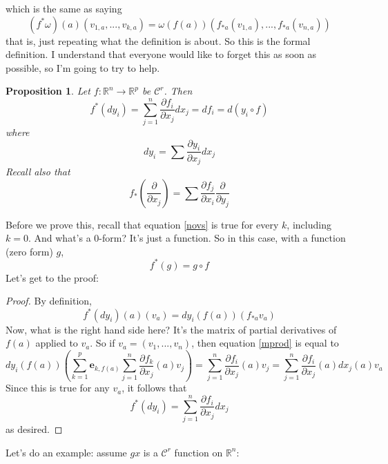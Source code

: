 \documentclass{article}
\newtheorem{proposition}{Proposition}
\newcommand{\reals}[0]{\mathbb{R}}
\newcommand{\mc}[1]{\mathcal{#1}}
\newcommand{\prt}[2]{\frac{\partial #1}{\partial #2}}
\newcommand{\mb}[1]{\mathbf{#1}}
\begin{document}
which is the same as saying
\begin{equation}
  (f^*\omega)(a)(v_{1, a},...,v_{k, a}) = \omega(f(a))(f_{*a}(v_{1,a}),...,f_{*a}(v_{n,a}))
\end{equation}
that is, just repeating what the definition is about. So this is the formal definition. I understand that everyone would like to forget this as soon as possible, so I'm going to try to help.
\begin{proposition}
  Let \(f: \reals^n \to \reals^p\) be \(\mc{C}^r\). Then
  \begin{equation}
    f^*(dy_i) = \sum_{j = 1}^n\prt{f_i}{x_j}dx_j = df_i = d(y_i \circ f)
  \end{equation}
  where
  \begin{equation}
    dy_i = \sum\prt{y_i}{x_j}dx_j
  \end{equation}
  Recall also that
  \begin{equation}
    f_*\left(\prt{}{x_j}\right) = \sum\prt{f_j}{x_i}\prt{}{y_j}
  \end{equation}
\end{proposition}
Before we prove this, recall that equation \ref{novs} is true for every \(k\), including \(k = 0\). And what's a 0-form? It's just a function. So in this case, with a function (zero form) \(g\),
\begin{equation}
  f^*(g) = g \circ f
\end{equation}
Let's get to the proof:
\begin{proof}
  By definition,
  \begin{equation}
    f^*(dy_i)(a)(v_a) = dy_i(f(a))(f_{*a}v_a)
    \label{mprod}
  \end{equation}
  Now, what is the right hand side here? It's the matrix of partial derivatives of \(f(a)\) applied to \(v_a\). So if \(v_a = (v_1,...,v_n)\), then equation \ref{mprod} is equal to
  \begin{equation}
    dy_i(f(a))\left(\sum_{k = 1}^p\mb{e}_{k, f(a)}
      \sum_{j = 1}^n\prt{f_k}{x_j}(a)v_j\right)
      = \sum_{j = 1}^n\prt{f_i}{x_j}(a)v_j
      = \sum_{j = 1}^n\prt{f_i}{x_j}(a)dx_j(a)v_a
  \end{equation}
  Since this is true for any \(v_a\), it follows that
  \begin{equation}
    f^*(dy_i) = \sum_{j = 1}^n\prt{f_i}{x_j}dx_j
  \end{equation}
  as desired.
\end{proof}
Let's do an example: assume \(gx\) is a \(\mc{C}^r\) function on \(\reals^n\):
\end{document}
